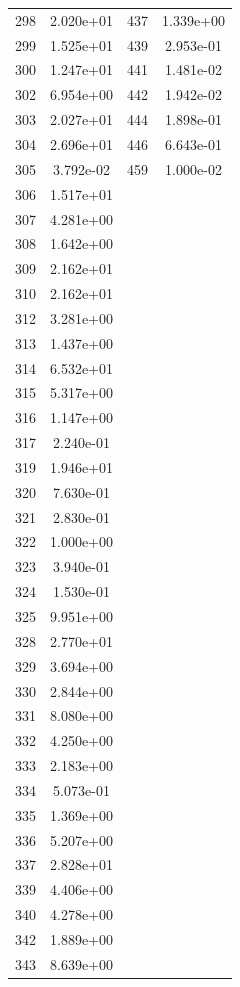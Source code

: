 \documentclass[12pt]{article}
\begin{document}
\begin{longtable}{@{}cccc@{}}
298 & 2.020e+01 & 437 & 1.339e+00 \\
299 & 1.525e+01 & 439 & 2.953e-01 \\
300 & 1.247e+01 & 441 & 1.481e-02 \\
302 & 6.954e+00 & 442 & 1.942e-02 \\
303 & 2.027e+01 & 444 & 1.898e-01 \\
304 & 2.696e+01 & 446 & 6.643e-01 \\
305 & 3.792e-02 & 459 & 1.000e-02 \\
306 & 1.517e+01 &  &  \\
307 & 4.281e+00 &  &  \\
308 & 1.642e+00 &  &  \\
309 & 2.162e+01 &  &  \\
310 & 2.162e+01 &  &  \\
312 & 3.281e+00 &  &  \\
313 & 1.437e+00 &  &  \\
314 & 6.532e+01 &  &  \\
315 & 5.317e+00 &  &  \\
316 & 1.147e+00 &  &  \\
317 & 2.240e-01 &  &  \\
319 & 1.946e+01 &  &  \\
320 & 7.630e-01 &  &  \\
321 & 2.830e-01 &  &  \\
322 & 1.000e+00 &  &  \\
323 & 3.940e-01 &  &  \\
324 & 1.530e-01 &  &  \\
325 & 9.951e+00 &  &  \\
328 & 2.770e+01 &  &  \\
329 & 3.694e+00 &  &  \\
330 & 2.844e+00 &  &  \\
331 & 8.080e+00 &  &  \\
332 & 4.250e+00 &  &  \\
333 & 2.183e+00 &  &  \\
334 & 5.073e-01 &  &  \\
335 & 1.369e+00 &  &  \\
336 & 5.207e+00 &  &  \\
337 & 2.828e+01 &  &  \\
339 & 4.406e+00 &  &  \\
340 & 4.278e+00 &  &  \\
342 & 1.889e+00 &  &  \\
343 & 8.639e+00 &  &  \\

\end{longtable}
\end{document}
